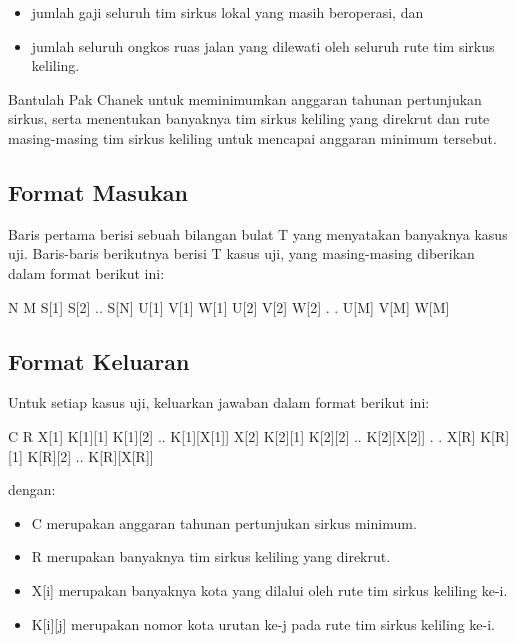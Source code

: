 \documentclass[../main_problemset.tex]{subfiles} %
\begin{document}
\begin{itemize}
	\item jumlah gaji seluruh tim sirkus lokal yang masih beroperasi, dan
	\item jumlah seluruh ongkos ruas jalan yang dilewati oleh seluruh rute tim sirkus keliling.
\end{itemize}

Bantulah Pak Chanek untuk meminimumkan anggaran tahunan pertunjukan sirkus, serta menentukan banyaknya tim sirkus keliling yang direkrut dan rute masing-masing tim sirkus keliling untuk mencapai anggaran minimum tersebut.

\subsection*{Format Masukan}

Baris pertama berisi sebuah bilangan bulat T yang menyatakan banyaknya kasus uji. Baris-baris berikutnya berisi T kasus uji, yang masing-masing diberikan dalam format berikut ini:

\begin{lcverbatim}
N M
S[1] S[2] .. S[N]
U[1] V[1] W[1]
U[2] V[2] W[2]
.
.
U[M] V[M] W[M]
\end{lcverbatim}

\pagebreak
\subsection*{Format Keluaran}

Untuk setiap kasus uji, keluarkan jawaban dalam format berikut ini:

\begin{lcverbatim}
C R
X[1] K[1][1] K[1][2] .. K[1][X[1]]
X[2] K[2][1] K[2][2] .. K[2][X[2]]
.
.
X[R] K[R][1] K[R][2] .. K[R][X[R]]
\end{lcverbatim}

dengan:

\begin{itemize}
    \item C merupakan anggaran tahunan pertunjukan sirkus minimum.
    \item R merupakan banyaknya tim sirkus keliling yang direkrut.
    \item X[i] merupakan banyaknya kota yang dilalui oleh rute tim sirkus keliling ke-i.
    \item K[i][j] merupakan nomor kota urutan ke-j pada rute tim sirkus keliling ke-i.
\end{itemize}
\end{document}
